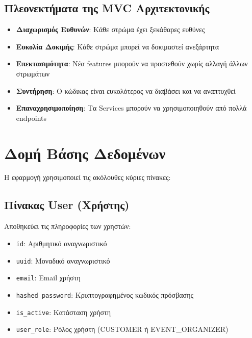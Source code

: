 \documentclass[12pt,a4paper]{report}
\begin{document}
\subsection{Πλεονεκτήματα της MVC Αρχιτεκτονικής}

\begin{itemize}
    \item \textbf{Διαχωρισμός Ευθυνών}: Κάθε στρώμα έχει ξεκάθαρες ευθύνες
    \item \textbf{Ευκολία Δοκιμής}: Κάθε στρώμα μπορεί να δοκιμαστεί ανεξάρτητα
    \item \textbf{Επεκτασιμότητα}: Νέα features μπορούν να προστεθούν χωρίς αλλαγή άλλων στρωμάτων
    \item \textbf{Συντήρηση}: Ο κώδικας είναι ευκολότερος να διαβάσει και να αναπτυχθεί
    \item \textbf{Επαναχρησιμοποίηση}: Τα Services μπορούν να χρησιμοποιηθούν από πολλά endpoints
\end{itemize}

\section{Δομή Βάσης Δεδομένων}

Η εφαρμογή χρησιμοποιεί τις ακόλουθες κύριες πίνακες:

\subsection{Πίνακας User (Χρήστης)}
Αποθηκεύει τις πληροφορίες των χρηστών:
\begin{itemize}
    \item \texttt{id}: Αριθμητικό αναγνωριστικό
    \item \texttt{uuid}: Μοναδικό αναγνωριστικό
    \item \texttt{email}: Email χρήστη
    \item \texttt{hashed\_password}: Κρυπτογραφημένος κωδικός πρόσβασης
    \item \texttt{is\_active}: Κατάσταση χρήστη
    \item \texttt{user\_role}: Ρόλος χρήστη (CUSTOMER ή EVENT\_ORGANIZER)
\end{itemize}
\end{document}
